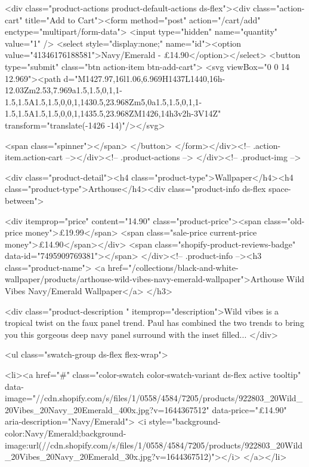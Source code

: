 {{{{{{{<div class="product-actions product-default-actions ds-flex"><div class="action-cart" title="Add to Cart"><form method="post" action="/cart/add" enctype="multipart/form-data">
            <input type="hidden" name="quantity" value="1" />
            <select style="display:none;" name="id"><option value="41346176188581">Navy/Emerald - £14.90</option></select>
            <button type="submit" class="btn action-item btn-add-cart">
              <svg viewBox="0 0 14 12.969"><path d="M1427.97,16l1.06,6.969H1437L1440,16h-12.03Zm2.53,7.969a1.5,1.5,0,1,1-1.5,1.5A1.5,1.5,0,0,1,1430.5,23.968Zm5,0a1.5,1.5,0,1,1-1.5,1.5A1.5,1.5,0,0,1,1435.5,23.968ZM1426,14h3v2h-3V14Z" transform="translate(-1426 -14)"/></svg>

              <span class="spinner"></span>
            </button>
          </form></div><!-- .action-item.action-cart --></div><!-- .product-actions -->
</div><!-- .product-img -->

<div class="product-detail"><h4 class="product-type">Wallpaper</h4><h4 class="product-type">Arthouse</h4><div class="product-info ds-flex space-between">
    
<div itemprop="price" content="14.90" class="product-price"><span class="old-price money">£19.99</span>
    <span class="sale-price current-price money">£14.90</span></div>
    <span class="shopify-product-reviews-badge" data-id="7495909769381"></span>
  </div><!-- .product-info --><h3 class="product-name">
      <a href="/collections/black-and-white-wallpaper/products/arthouse-wild-vibes-navy-emerald-wallpaper">Arthouse Wild Vibes Navy/Emerald Wallpaper</a>
    </h3>
    
<div class="product-description " itemprop="description">Wild vibes is a tropical twist on the faux panel trend. Paul has combined the two trends to bring you this gorgeous deep navy panel surround with the inset filled...
</div>



<ul class="swatch-group ds-flex flex-wrap">
        
<li><a href="#" class="color-swatch color-swatch-variant ds-flex active tooltip" data-image="//cdn.shopify.com/s/files/1/0558/4584/7205/products/922803_20Wild_20Vibes_20Navy_20Emerald_400x.jpg?v=1644367512" data-price="£14.90" aria-description="Navy/Emerald">
              <i style="background-color:Navy/Emerald;background-image:url(//cdn.shopify.com/s/files/1/0558/4584/7205/products/922803_20Wild_20Vibes_20Navy_20Emerald_30x.jpg?v=1644367512)"></i>
            </a></li>

}}}}}}}
